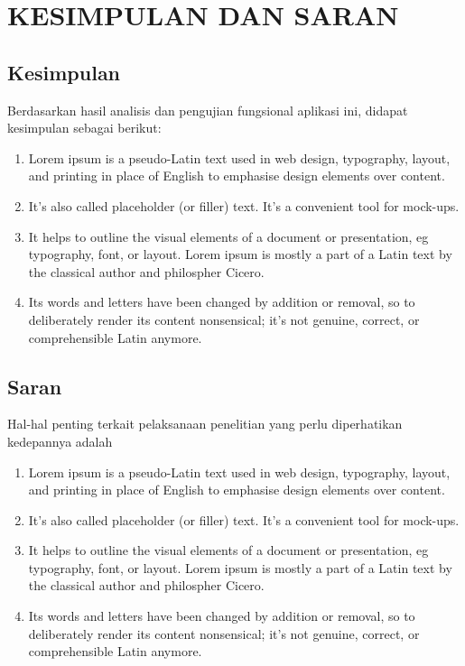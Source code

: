 \chapter{KESIMPULAN DAN SARAN}

\section{Kesimpulan}
Berdasarkan hasil analisis dan pengujian fungsional aplikasi ini, didapat kesimpulan sebagai berikut:

\begin{enumerate}
	\item Lorem ipsum is a pseudo-Latin text used in web design, typography, layout, and printing in place of English to emphasise design elements over content.

	\item It's also called placeholder (or filler) text. It's a convenient tool for mock-ups.

	\item It helps to outline the visual elements of a document or presentation, eg typography, font, or layout. Lorem ipsum is mostly a part of a Latin text by the classical author and philospher Cicero.

	\item Its words and letters have been changed by addition or removal, so to deliberately render its content nonsensical; it's not genuine, correct, or comprehensible Latin anymore.
\end{enumerate}


\section{Saran}
Hal-hal penting terkait pelaksanaan penelitian yang perlu diperhatikan kedepannya adalah
\begin{enumerate}
	\item Lorem ipsum is a pseudo-Latin text used in web design, typography, layout, and printing in place of English to emphasise design elements over content.

	\item It's also called placeholder (or filler) text. It's a convenient tool for mock-ups.

	\item It helps to outline the visual elements of a document or presentation, eg typography, font, or layout. Lorem ipsum is mostly a part of a Latin text by the classical author and philospher Cicero.

	\item Its words and letters have been changed by addition or removal, so to deliberately render its content nonsensical; it's not genuine, correct, or comprehensible Latin anymore.
\end{enumerate}


\begin{comment}

\end{comment}
